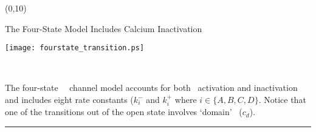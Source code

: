 \documentclass[a0]{a0poster}
\def\CHead#1{\begin{center} {\LARGE\color{DarkBlue} #1} \end{center} \bigskip}
\begin{document}
\begin{textblock}{7}(0,10)
\CHead{The Four-State Model Includes Calcium Inactivation}
\begin{center}
\begin{minipage}{2.5in}
\texttt{[image: fourstate\_transition.ps]}
\end{minipage}
\begin{minipage}{1in}
\ \\
\end{minipage}
\begin{minipage}{7.5in}
The four-state \Ipr\ \Ca\ channel model accounts for both \Ca\ activation and inactivation 
and includes eight rate constants ($k^-_i$ and $k^+_i$
where $i \in \{ A, B, C, D \}$. Notice that one of the transitions 
out of the open state involves `domain' \Ca\ ($c_d$). 
\end{minipage}
\end{center}
\medskip\hrule
\end{textblock}

\end{document}

